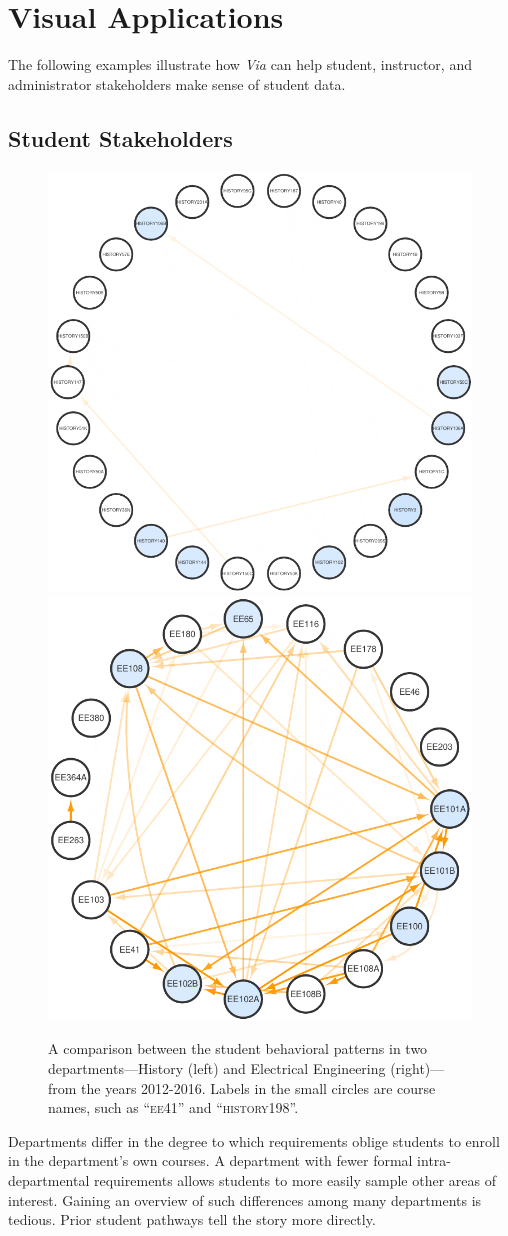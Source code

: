\section{Visual Applications}
\label{sec:analysis}
The following examples illustrate how {\em Via} can help student,
instructor, and administrator stakeholders make sense of student data.

\subsection{Student Stakeholders}
\label{sec:student-stakeholders}

\begin{figure}
    \centering
    \includegraphics[width=0.55\columnwidth]{Figs/final-modularity-history.pdf}
    \includegraphics[width=0.44\columnwidth]{Figs/final-modularity-ee.pdf}
    \caption{A comparison between the student behavioral patterns in two departments---History (left) and Electrical Engineering (right)---from the years 2012-2016. Labels in the small circles are course names, such as ``\textsc{ee41}'' and ``\textsc{history198}''.}
    \label{fig:modularity}
\end{figure}

Departments differ in the degree to which requirements oblige students to enroll in the department's own courses. A department with fewer formal intra-departmental requirements allows students to more easily sample other areas of interest. Gaining an overview of such differences among many departments is tedious. Prior student pathways tell the story more directly.

